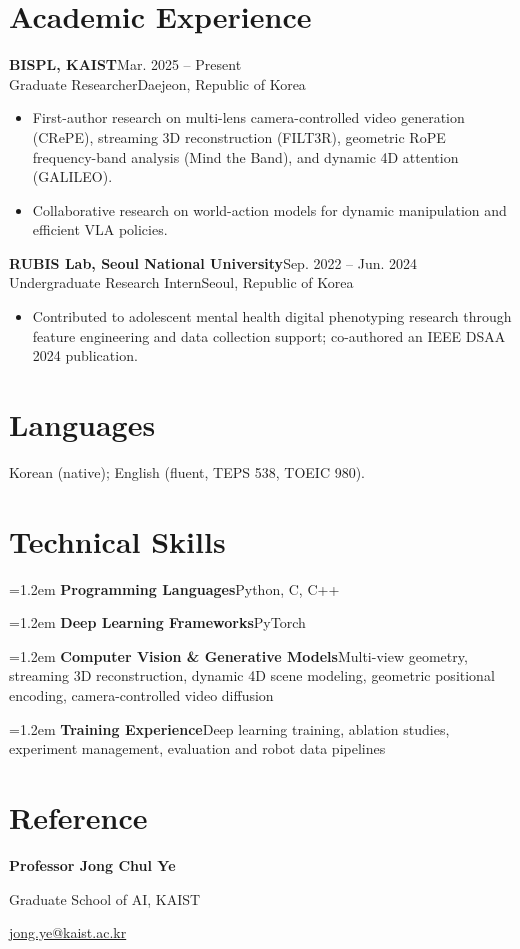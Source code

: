 \documentclass[10pt,letterpaper]{article}
\newcommand{\entry}[4]{%
  \noindent\textbf{#1}\hfill{\small\color{gray}#2}\\
  \noindent #3\hfill{\small\color{gray}#4}\par}
\newcommand{\skill}[2]{\noindent\hangindent=1.2em\hangafter=1 \textbf{#1}\quad #2\par\vspace{0.2em}}
\begin{document}
\section{Academic Experience}
\entry{BISPL, KAIST}{Mar. 2025 -- Present}
      {Graduate Researcher}{Daejeon, Republic of Korea}
\begin{itemize}
  \item First-author research on multi-lens camera-controlled video generation (CRePE), streaming 3D reconstruction (FILT3R), geometric RoPE frequency-band analysis (Mind the Band), and dynamic 4D attention (GALILEO).
  \item Collaborative research on world-action models for dynamic manipulation and efficient VLA policies.
\end{itemize}
\vspace{0.6em}
\entry{RUBIS Lab, Seoul National University}{Sep. 2022 -- Jun. 2024}
      {Undergraduate Research Intern}{Seoul, Republic of Korea}
\begin{itemize}
  \item Contributed to adolescent mental health digital phenotyping research through feature engineering and data collection support; co-authored an IEEE DSAA 2024 publication.
\end{itemize}

\section{Languages}
Korean (native); English (fluent, TEPS 538, TOEIC 980).\par

\section{Technical Skills}
\skill{Programming Languages}{Python, C, C++}
\skill{Deep Learning Frameworks}{PyTorch}
\skill{Computer Vision \& Generative Models}{Multi-view geometry, streaming 3D reconstruction, dynamic 4D scene modeling, geometric positional encoding, camera-controlled video diffusion}
\skill{Training Experience}{Deep learning training, ablation studies, experiment management, evaluation and robot data pipelines}

\section{Reference}
\textbf{Professor Jong Chul Ye}\par
Graduate School of AI, KAIST\par
\href{mailto:jong.ye@kaist.ac.kr}{jong.ye@kaist.ac.kr}\par
\end{document}
